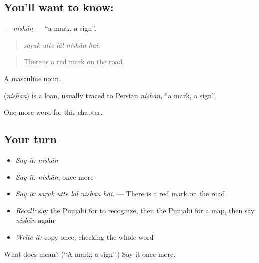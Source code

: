 \subsection*{You'll want to know: }
\textbf{} — \emph{nishān} — \textquotedblleft{}a mark; a sign\textquotedblright{}.

\begin{quote}
    
\end{quote}

\begin{quote}
\emph{saṛak utte lāl nishān hai.}
\end{quote}

\begin{quote}
There is a red mark on the road.
\end{quote}

A masculine noun.

\begin{cousinweb}
\textbf{} (\emph{nishān}) is a loan, usually traced to Persian \emph{nishān}, \textquotedblleft{}a mark, a sign\textquotedblright{}.
\end{cousinweb}

\begin{grammarlens}[title={What you've built}]
One more word for this chapter.
\end{grammarlens}

\subsection*{Your turn}
\begin{itemize}
\raggedright
  \item \emph{Say it:} \emph{nishān}
  \item \emph{Say it:} \emph{nishān}, once more
  \item \emph{Say it:} \emph{saṛak utte lāl nishān hai.} — There is a red mark on the road.
  \item \emph{Recall:} say the Punjabi for to recognize, then the Punjabi for a map, then say \emph{nishān} again
  \item \emph{Write it:} copy \textbf{} once, checking the whole word
\end{itemize}

\begin{tcolorbox}[breakable,colback=teal!4,colframe=teal!35!black,title={Before you move on}]
What does  mean? (\textquotedblleft{}A mark; a sign\textquotedblright{}.) Say it once more.
\end{tcolorbox}
